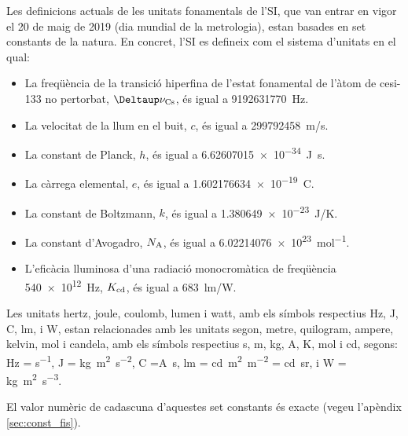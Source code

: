 Les definicions actuals de les unitats fonamentals de l'SI, que van entrar en vigor el 20 de maig de 2019 (dia mundial de la metrologia), estan basades en set constants de la natura. En concret, l'SI es defineix com el  sistema d'unitats en el qual:
\begin{itemize}

\item La freqüència de la transició hiperfina de l'estat fonamental de l'àtom de cesi-133 no pertorbat, $\Deltaup\nu\ped{Cs}$, és igual a \qty{9 192 631 770}{Hz}.
\item La velocitat de la llum en el buit, $c$, és igual a \qty{299792458}{m/s}.
\item La constant de Planck, $h$, és igual a \qty{6,62607015 e-34}{J.s}.
\item La càrrega elemental, $e$, és igual a \qty{1,602176634 e-19}{C}.
\item La constant de Boltzmann, $k$, és igual a \qty{1,380649e-23}{J/K}.
\item La constant d'Avogadro, $N_\mathrm{A}$, és igual a \qty{6,02214076 e23}{mol^{-1}}.
\item L'eficàcia lluminosa d'una radiació monocromàtica de freqüència \qty{540e12}{Hz},  $K_\mathrm{cd}$, és igual a \qty{683}{lm/W}.
\end{itemize}
 
 


Les unitats  hertz, joule, coulomb, lumen i watt, amb els símbols respectius Hz, J, C, lm, i W, estan relacionades amb les unitats segon, metre, quilogram, ampere, kelvin, mol i candela, amb els símbols respectius s, m, kg, A, K, mol i cd, segons:  Hz = \unit{s^{-1}}, J = \unit{kg.m^2.s^{-2}}, C =\unit{A.s}, lm = \unit{cd.m^2.m^{-2}} = \unit{cd.sr}, i W = \unit{kg.m^2.s^{-3}}.

El valor numèric de cadascuna d'aquestes set constants és exacte (vegeu l'apèndix \vref{sec:const_fis}).

